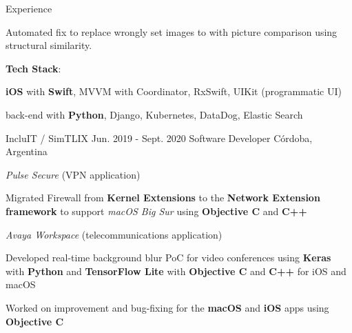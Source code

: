 \documentclass{curriculum}
\begin{document}
\begin{cvsection}{Experience}
\begin{sectionitemlist}
        \item{
            Automated fix to replace wrongly set images to with
            picture comparison using structural similarity.
        }

        \item{
            \textbf{Tech Stack}:
        }{
            \begin{colsectionitemlist}{1}
            \item{
                \textbf{iOS} with \textbf{Swift},
                MVVM with Coordinator,
                RxSwift,
                UIKit (programmatic UI)
            }
            \item{
                back-end with \textbf{Python},
                Django,
                Kubernetes,
                DataDog,
                Elastic Search
            }
            \end{colsectionitemlist}
        }

        \end{sectionitemlist}


    \makesectionitemheader
        {IncluIT / SimTLIX}                             {Jun. 2019 - Sept. 2020}
        {Software Developer}                                {Córdoba, Argentina}

        \begin{sectionitemlist}

        \item{\textit{Pulse Secure} (VPN application)}
            \begin{sectionitemlist}
            \item{
                Migrated Firewall from \textbf{Kernel Extensions} to the
                \textbf{Network Extension framework} to support \textit{macOS Big Sur}
                using \textbf{Objective C} and \textbf{C++}
            }
            \end{sectionitemlist}

        \item{\textit{Avaya Workspace} (telecommunications application)}
            \begin{sectionitemlist}
            \item{
                Developed real-time background blur PoC for video conferences using
                \textbf{Keras} with \textbf{Python} and \textbf{TensorFlow Lite}
                with \textbf{Objective C} and \textbf{C++} for iOS and macOS
            }
            \item{
                Worked on improvement and bug-fixing for the \textbf{macOS}
                and \textbf{iOS} apps using \textbf{Objective C}
            }
            \end{sectionitemlist}


\end{sectionitemlist}
\end{cvsection}
\end{document}
